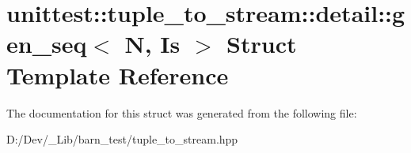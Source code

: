 \hypertarget{structunittest_1_1tuple__to__stream_1_1detail_1_1gen__seq}{}\section{unittest\+:\+:tuple\+\_\+to\+\_\+stream\+:\+:detail\+:\+:gen\+\_\+seq$<$ N, Is $>$ Struct Template Reference}
\label{structunittest_1_1tuple__to__stream_1_1detail_1_1gen__seq}


The documentation for this struct was generated from the following file\+:\begin{DoxyCompactItemize}
\item 
D\+:/\+Dev/\+\_\+\+Lib/barn\+\_\+test/tuple\+\_\+to\+\_\+stream.\+hpp\end{DoxyCompactItemize}
